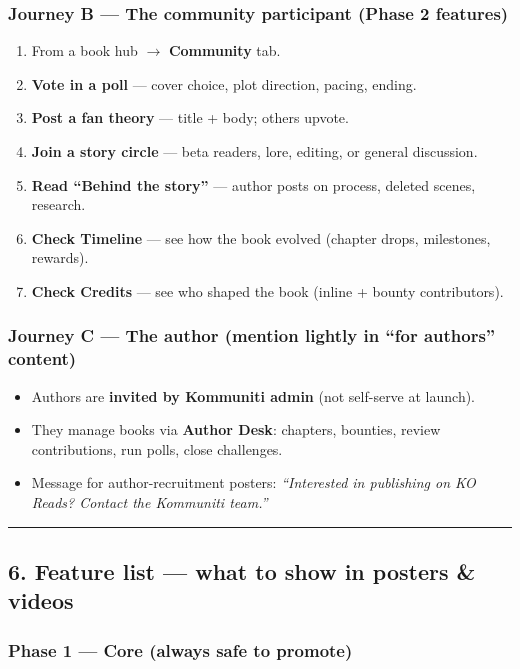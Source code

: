 \documentclass[11pt,a4paper]{report}
\begin{document}
\subsubsection{Journey B --- The community participant (Phase 2 features)}

\begin{enumerate}
  \item From a book hub $\rightarrow$ \textbf{Community} tab.
  \item \textbf{Vote in a poll} --- cover choice, plot direction, pacing, ending.
  \item \textbf{Post a fan theory} --- title + body; others upvote.
  \item \textbf{Join a story circle} --- beta readers, lore, editing, or general discussion.
  \item \textbf{Read “Behind the story”} --- author posts on process, deleted scenes, research.
  \item \textbf{Check Timeline} --- see how the book evolved (chapter drops, milestones, rewards).
  \item \textbf{Check Credits} --- see who shaped the book (inline + bounty contributors).
\end{enumerate}

\subsubsection{Journey C --- The author (mention lightly in “for authors” content)}

\begin{itemize}
  \item Authors are \textbf{invited by Kommuniti admin} (not self-serve at launch).
  \item They manage books via \textbf{Author Desk}: chapters, bounties, review contributions, run polls, close challenges.
  \item Message for author-recruitment posters: \textit{“Interested in publishing on KO Reads? Contact the Kommuniti team.”}
\end{itemize}

\medskip\hrule\medskip

\subsection{6. Feature list --- what to show in posters \& videos}

\subsubsection{Phase 1 --- Core (always safe to promote)}
\end{document}
